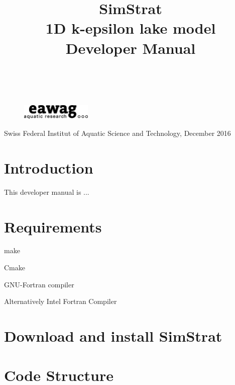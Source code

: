 \documentclass[paper=a4, fontsize=12pt]{article}
\title{\vspace{-15mm}\huge SimStrat \\ 1D k-epsilon lake model \\[0.5cm] \textbf{Developer Manual}} %
\author{
\large
{\textsc{}}\\[2mm]
}
\date{}
\begin{document}
\begin{titlepage}
	\maketitle %
	\thispagestyle{empty}
	\tableofcontents
	\vspace{5cm}
	\begin{figure}[h]
		\includegraphics[width=0.3\textwidth]{ealogo05-150.eps}
	\end{figure}

	\noindent{}\selectfont Swiss Federal Institut of Aquatic Science and Technology, December 2016
\end{titlepage}
\thispagestyle{fancy} %

\section{Introduction}
This developer manual is ...

\section{Requirements}

make

Cmake

GNU-Fortran compiler

Alternatively Intel Fortran Compiler

\section{Download and install SimStrat}

\section{Code Structure}
\end{document}
